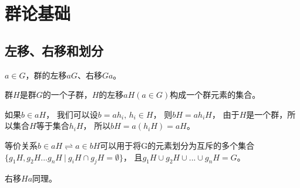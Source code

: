 \section{群论基础}

\subsection{}

\subsection{左移、右移和划分}

$a\in G$，群的左移$aG$、右移$Ga$。

群$H$是群$G$的一个子群，$H$的左移$aH(a\in G)$构成一个群元素的集合。

如果$b\in aH$，
我们可以设$b= ah_{i},\,h_{i}\in H$，
则$bH=ah_{i}H$，
由于$H$是一个群，所以集合$H$等于集合$h_{i}H$，
所以$bH=a(h_{i}H)=aH$。

等价关系$b\in aH\rightleftharpoons a\in bH$可以用于将G的元素划分为互斥的多个集合
$\{g_{1}H,g_{2}H...g_{n}H\ |\ g_{i}H\cap g_{j}H=\emptyset\}$，
且$g_{1}H\cup g_{2}H\cup ...\cup g_{n}H=G$。

右移$Ha$同理。

